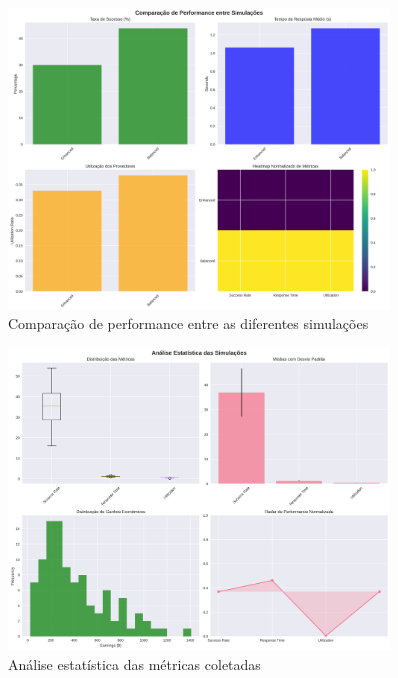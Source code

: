 \documentclass[12pt,a4paper]{article}
\begin{document}
\begin{figure}[H]
    \centering
    \includegraphics[width=0.9\textwidth]{performance_comparison.png}
    \caption{Comparação de performance entre as diferentes simulações}
    \label{fig:performance}
\end{figure}

\begin{figure}[H]
    \centering
    \includegraphics[width=0.9\textwidth]{statistical_analysis.png}
    \caption{Análise estatística das métricas coletadas}
    \label{fig:statistics}
\end{figure}
\end{document}

